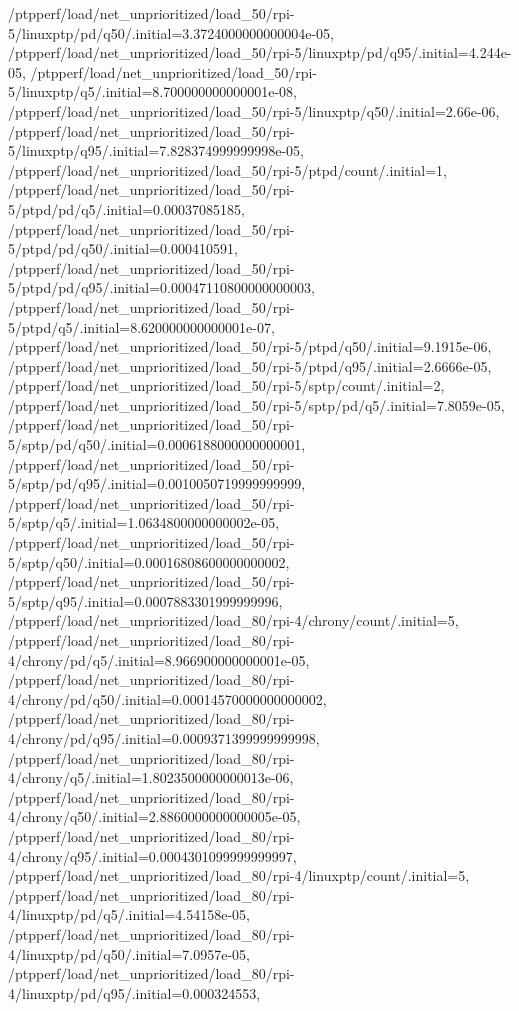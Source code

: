 {    /ptpperf/load/net_unprioritized/load_50/rpi-5/linuxptp/pd/q50/.initial=3.3724000000000004e-05,
    /ptpperf/load/net_unprioritized/load_50/rpi-5/linuxptp/pd/q95/.initial=4.244e-05,
    /ptpperf/load/net_unprioritized/load_50/rpi-5/linuxptp/q5/.initial=8.700000000000001e-08,
    /ptpperf/load/net_unprioritized/load_50/rpi-5/linuxptp/q50/.initial=2.66e-06,
    /ptpperf/load/net_unprioritized/load_50/rpi-5/linuxptp/q95/.initial=7.828374999999998e-05,
    /ptpperf/load/net_unprioritized/load_50/rpi-5/ptpd/count/.initial=1,
    /ptpperf/load/net_unprioritized/load_50/rpi-5/ptpd/pd/q5/.initial=0.00037085185,
    /ptpperf/load/net_unprioritized/load_50/rpi-5/ptpd/pd/q50/.initial=0.000410591,
    /ptpperf/load/net_unprioritized/load_50/rpi-5/ptpd/pd/q95/.initial=0.00047110800000000003,
    /ptpperf/load/net_unprioritized/load_50/rpi-5/ptpd/q5/.initial=8.620000000000001e-07,
    /ptpperf/load/net_unprioritized/load_50/rpi-5/ptpd/q50/.initial=9.1915e-06,
    /ptpperf/load/net_unprioritized/load_50/rpi-5/ptpd/q95/.initial=2.6666e-05,
    /ptpperf/load/net_unprioritized/load_50/rpi-5/sptp/count/.initial=2,
    /ptpperf/load/net_unprioritized/load_50/rpi-5/sptp/pd/q5/.initial=7.8059e-05,
    /ptpperf/load/net_unprioritized/load_50/rpi-5/sptp/pd/q50/.initial=0.0006188000000000001,
    /ptpperf/load/net_unprioritized/load_50/rpi-5/sptp/pd/q95/.initial=0.0010050719999999999,
    /ptpperf/load/net_unprioritized/load_50/rpi-5/sptp/q5/.initial=1.0634800000000002e-05,
    /ptpperf/load/net_unprioritized/load_50/rpi-5/sptp/q50/.initial=0.00016808600000000002,
    /ptpperf/load/net_unprioritized/load_50/rpi-5/sptp/q95/.initial=0.0007883301999999996,
    /ptpperf/load/net_unprioritized/load_80/rpi-4/chrony/count/.initial=5,
    /ptpperf/load/net_unprioritized/load_80/rpi-4/chrony/pd/q5/.initial=8.966900000000001e-05,
    /ptpperf/load/net_unprioritized/load_80/rpi-4/chrony/pd/q50/.initial=0.00014570000000000002,
    /ptpperf/load/net_unprioritized/load_80/rpi-4/chrony/pd/q95/.initial=0.0009371399999999998,
    /ptpperf/load/net_unprioritized/load_80/rpi-4/chrony/q5/.initial=1.8023500000000013e-06,
    /ptpperf/load/net_unprioritized/load_80/rpi-4/chrony/q50/.initial=2.8860000000000005e-05,
    /ptpperf/load/net_unprioritized/load_80/rpi-4/chrony/q95/.initial=0.0004301099999999997,
    /ptpperf/load/net_unprioritized/load_80/rpi-4/linuxptp/count/.initial=5,
    /ptpperf/load/net_unprioritized/load_80/rpi-4/linuxptp/pd/q5/.initial=4.54158e-05,
    /ptpperf/load/net_unprioritized/load_80/rpi-4/linuxptp/pd/q50/.initial=7.0957e-05,
    /ptpperf/load/net_unprioritized/load_80/rpi-4/linuxptp/pd/q95/.initial=0.000324553,
}
